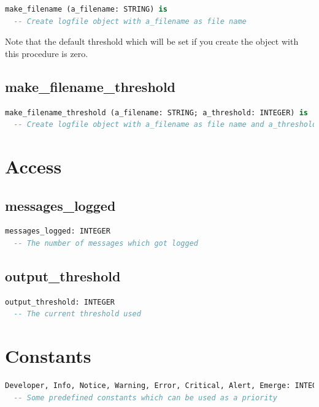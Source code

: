 \documentclass[a4paper,fleqn]{report}
\begin{document}
\begin{lstlisting}[language=Eiffel]
make_filename (a_filename: STRING) is
  -- Create logfile object with a_filename as file name
\end{lstlisting}

Note that the default threshold which will be set if you create the
object with this procedure is zero.


\subsection{make\_filename\_threshold}
\label{sec:make_filename_threshold}

\begin{lstlisting}[language=Eiffel]
make_filename_threshold (a_filename: STRING; a_threshold: INTEGER) is
  -- Create logfile object with a_filename as file name and a_threshold as output threshold
\end{lstlisting}


\section{Access}
\label{sec:access}


\subsection{messages\_logged}
\label{sec:messages_logged}

\begin{lstlisting}[language=Eiffel]
messages_logged: INTEGER
  -- The number of messages which got logged
\end{lstlisting}


\subsection{output\_threshold}
\label{sec:output_threshold}

\begin{lstlisting}[language=Eiffel]
output_threshold: INTEGER
  -- The current threshold used
\end{lstlisting}


\section{Constants}
\label{sec:Constants}

\begin{lstlisting}[language=Eiffel]
Developer, Info, Notice, Warning, Error, Critical, Alert, Emerge: INTEGER is unique
  -- Some predefined constants which can be used as a priority
\end{lstlisting}
\end{document}
